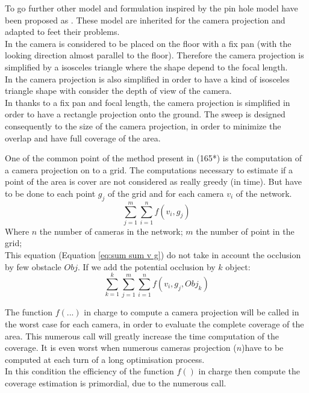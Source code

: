 To go further other model and formulation inspired by the pin hole model have been proposed as \cite{87*morsly2012,141*akbarzadeh2013,146*li2011,194*fu2010}. These model are inherited for the camera projection and adapted to feet their problems. \\
In \cite{87*morsly2012,194*fu2010} the camera is considered to be placed on the floor with a fix pan (with the looking direction almost parallel to the floor). Therefore the camera projection is simplified by a isosceles triangle where the shape depend to the focal length.\\
In \citep{141*akbarzadeh2013} the camera projection is also simplified in order to have a kind of isosceles triangle shape with consider the depth of view of the camera.\\
In \citep{146*li2011} thanks to a fix pan and focal length, the camera projection is simplified in order to have a rectangle projection onto the ground. The sweep is designed consequently to the size of the camera projection, in order to minimize the overlap and have full coverage of the area.  


One of the common point of the method present  in \cite{87*morsly2012,141*akbarzadeh2013,146*li2011,194*fu2010,22*zhao2008,33*reddy2012,193*fu2014,181*wang2017}  (165*) is the computation of a camera projection on to a grid. The computations necessary to estimate if a point of the area is cover are not considered as really greedy (in time). But have to be done to each point $g_j$ of the grid and for each camera $v_i$ of the network.
	\begin{equation} \label{eq:sum sum v g}
		\sum_{j=1}^{m}\sum_{i=1}^{n}f( v_i,g_j)
	\end{equation}
Where $n$ the number of cameras in the network; $m$ the number of point in the grid; \\
This equation (Equation \ref{eq:sum sum v g}) do not take in account the occlusion by few obstacle $Obj$. If we add the potential occlusion by $k$ object: 
	\begin{equation}
		 \sum_{k=1}^{k}\sum_{j=1}^{m}\sum_{i=1}^{n}f( v_i,g_j,Obj_k)
	\end{equation} 
 
The function $f(...)$ in charge to compute a camera projection will be called  in the worst case for each camera, in order to evaluate the complete coverage of the area. This numerous call will greatly increase the time computation of the coverage. It is even worst when numerous cameras projection ($n$)have to be computed at each turn of a long optimisation process.\\
In this condition the efficiency of the function $f()$ in charge then compute the coverage estimation is primordial, due to the numerous call.



